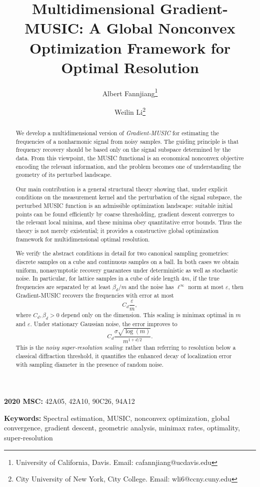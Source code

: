 \documentclass[11pt]{article}
\title{Multidimensional Gradient-MUSIC: A Global Nonconvex Optimization Framework for Optimal Resolution}
\author{Albert Fannjiang\footnote{University of California, Davis. Email: cafannjiang@ucdavis.edu} \and Weilin Li\footnote{City University of New York, City College. Email: wli6@ccny.cuny.edu}}
\theoremstyle{definition}
\numberwithin{theorem}{section}
\numberwithin{lemma}{section}
\numberwithin{equation}{section}
\renewcommand{\epsilon}{\varepsilon}
\numberwithin{equation}{section}
\begin{document}
	
	\maketitle
\begin{abstract}
We develop a multidimensional version of \emph{Gradient-MUSIC} for estimating the frequencies of a nonharmonic signal from noisy samples. The guiding principle is that frequency recovery should be based only on the signal subspace determined by the data. From this viewpoint, the MUSIC functional is an economical nonconvex objective encoding the relevant information, and the problem becomes one of understanding the geometry of its perturbed landscape.

Our main contribution is a general structural theory showing that, under explicit conditions on the measurement kernel and the perturbation of the signal subspace, the perturbed MUSIC function is an admissible optimization landscape: suitable initial points can be found efficiently by coarse thresholding, gradient descent converges to the relevant local minima, and these minima obey quantitative error bounds. Thus the theory is not merely existential; it provides a constructive global optimization framework for multidimensional optimal resolution.

We verify the abstract conditions in detail for two canonical sampling geometries: discrete samples on a cube and continuous samples on a ball. In both cases we obtain uniform, nonasymptotic recovery guarantees under deterministic as well as stochastic noise. In particular, for lattice samples in a cube of side length $4m$, if the true frequencies are separated by at least $\beta_d/m$ and the noise has $\ell^\infty$ norm at most $\epsilon$, then Gradient-MUSIC recovers the frequencies with error at most
\[
C_d \frac{\epsilon}{m},
\]
where $C_d, \beta_d>0$ depend only on the dimension. This scaling is minimax optimal in $m$ and $\epsilon$. Under stationary Gaussian noise, the error improves to
\[
C_d\frac{\sigma\sqrt{\log(m)}}{m^{1+d/2}}.
\]
This is the \emph{noisy super-resolution scaling}: rather than referring to resolution below a classical diffraction threshold, it quantifies the enhanced decay of localization error with sampling diameter in the presence of random noise.
\end{abstract}


	
	\medskip
	\noindent
	{\bf 2020 MSC:} 42A05, 42A10, 90C26, 94A12
	
	\medskip
	\noindent
	{\bf Keywords:} Spectral estimation, MUSIC, nonconvex optimization, global convergence, gradient descent, geometric analysis, minimax rates, optimality, super-resolution
\end{document}
